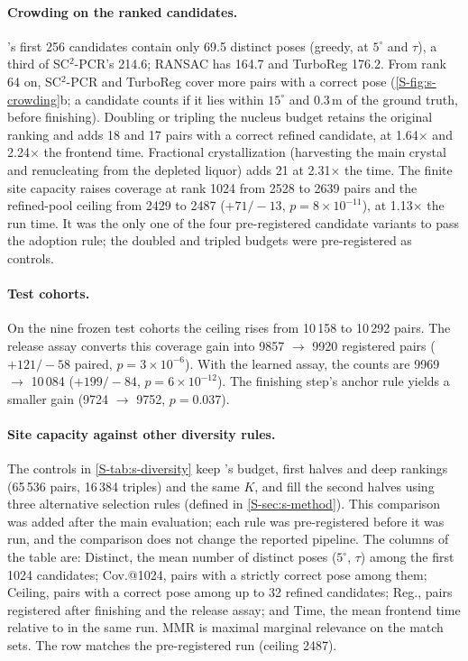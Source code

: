 \paragraph{Crowding on the ranked candidates.} \ngr{}'s first 256 candidates contain only 69.5 distinct poses (greedy, at $5^\circ$ and $\tau$), a third of SC$^2$-PCR's 214.6; RANSAC has 164.7 and TurboReg 176.2. From rank 64 on, SC$^2$-PCR and TurboReg cover more pairs with a correct pose (\cref{S-fig:s-crowding}b; a candidate counts if it lies within $15^\circ$ and 0.3\,m of the ground truth, before finishing). Doubling or tripling the nucleus budget retains the original ranking and adds 18 and 17 pairs with a correct refined candidate, at 1.64$\times$ and 2.24$\times$ the frontend time. Fractional crystallization (harvesting the main crystal and renucleating from the depleted liquor) adds 21 at 2.31$\times$ the time. The finite site capacity raises coverage at rank 1024 from 2528 to 2639 pairs and the refined-pool ceiling from 2429 to 2487 ($+71/-13$, $p=8\times10^{-11}$), at 1.13$\times$ the run time. It was the only one of the four pre-registered candidate variants to pass the adoption rule; the doubled and tripled budgets were pre-registered as controls.

\paragraph{Test cohorts.} On the nine frozen test cohorts the ceiling rises from 10\,158 to 10\,292 pairs. The release assay converts this coverage gain into 9857 $\to$ 9920 registered pairs ($+121/-58$ paired, $p=3\times10^{-6}$). With the learned assay, the counts are 9969 $\to$ 10\,084 ($+199/-84$, $p=6\times10^{-12}$). The finishing step's anchor rule yields a smaller gain (9724 $\to$ 9752, $p=0.037$).

\paragraph{Site capacity against other diversity rules.} The controls in \cref{S-tab:s-diversity} keep \ls{}'s budget, first halves and deep rankings (65\,536 pairs, 16\,384 triples) and the same $K$, and fill the second halves using three alternative selection rules (defined in \cref{S-sec:s-method}). This comparison was added after the main evaluation; each rule was pre-registered before it was run, and the comparison does not change the reported pipeline. The columns of the table are: Distinct, the mean number of distinct poses ($5^\circ$, $\tau$) among the first 1024 candidates; Cov.@1024, pairs with a strictly correct pose among them; Ceiling, pairs with a correct pose among up to 32 refined candidates; Reg., pairs registered after finishing and the release assay; and Time, the mean frontend time relative to \ls{} in the same run. MMR is maximal marginal relevance on the match sets. The \ls{} row matches the pre-registered run (ceiling 2487).

